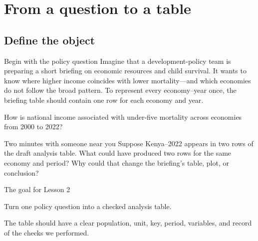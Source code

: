 \section{From a question to a table}
\subsection{Define the object}

\begin{frame}{Begin with the policy question}
  Imagine that a development-policy team is preparing a short briefing on
  economic resources and child survival. It wants to know where higher income
  coincides with lower mortality---and which economies do not follow the broad
  pattern. To represent every economy--year once, the briefing table should
  contain one row for each economy and year.

  \vspace{0.8em}
  \begin{center}
    {\Large\color{crimson}How is national income associated with under-five
    mortality across economies from 2000 to 2022?}
  \end{center}

  \begin{block}{Two minutes with someone near you}
    Suppose Kenya--2022 appears in two rows of the draft analysis table. What
    could have produced two rows for the same economy and period? Why could
    that change the briefing's table, plot, or conclusion?
  \end{block}
\end{frame}

\begin{frame}{The goal for Lesson 2}
  \vfill
  \begin{center}
    {\LARGE\color{crimson}Turn one policy question into a checked analysis table.}

    \vspace{0.8em}
    The table should have a clear population, unit, key, period, variables, and
    record of the checks we performed.
  \end{center}
  \vfill
\end{frame}

